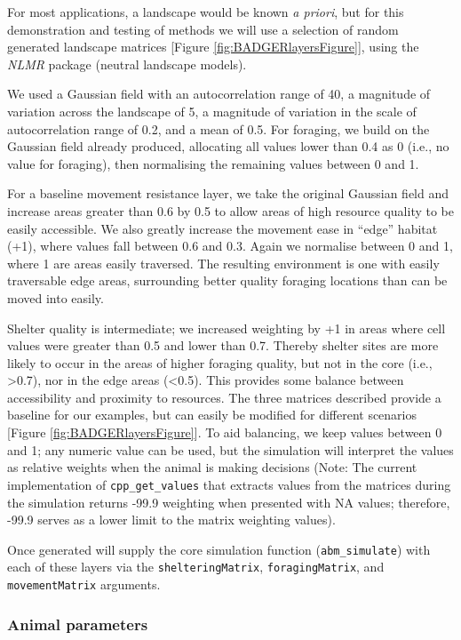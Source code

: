\documentclass[10pt,a4paper]{article}
\begin{document}
For most applications, a landscape would be known \emph{a priori}, but for this demonstration and testing of methods we will use a selection of random generated landscape matrices {[}Figure \ref{fig:BADGERlayersFigure}{]}, using the \emph{NLMR} package (neutral landscape models).

We used a Gaussian field with an autocorrelation range of 40, a magnitude of variation across the landscape of 5, a magnitude of variation in the scale of autocorrelation range of 0.2, and a mean of 0.5.
For foraging, we build on the Gaussian field already produced, allocating all values lower than 0.4 as 0 (i.e., no value for foraging), then normalising the remaining values between 0 and 1.

For a baseline movement resistance layer, we take the original Gaussian field and increase areas greater than 0.6 by 0.5 to allow areas of high resource quality to be easily accessible.
We also greatly increase the movement ease in ``edge'' habitat (+1), where values fall between 0.6 and 0.3.
Again we normalise between 0 and 1, where 1 are areas easily traversed.
The resulting environment is one with easily traversable edge areas, surrounding better quality foraging locations than can be moved into easily.

Shelter quality is intermediate; we increased weighting by +1 in areas where cell values were greater than 0.5 and lower than 0.7.
Thereby shelter sites are more likely to occur in the areas of higher foraging quality, but not in the core (i.e., \textgreater0.7), nor in the edge areas (\textless0.5).
This provides some balance between accessibility and proximity to resources.
The three matrices described provide a baseline for our examples, but can easily be modified for different scenarios {[}Figure \ref{fig:BADGERlayersFigure}{]}.
To aid balancing, we keep values between 0 and 1; any numeric value can be used, but the simulation will interpret the values as relative weights when the animal is making decisions (Note: The current implementation of \texttt{cpp\_get\_values} that extracts values from the matrices during the simulation returns -99.9 weighting when presented with NA values; therefore, -99.9 serves as a lower limit to the matrix weighting values).

Once generated will supply the core simulation function (\texttt{abm\_simulate}) with each of these layers via the \texttt{shelteringMatrix}, \texttt{foragingMatrix}, and \texttt{movementMatrix} arguments.

\hypertarget{animal-parameters}{%
\subsubsection{Animal parameters}\label{animal-parameters}}
\end{document}
